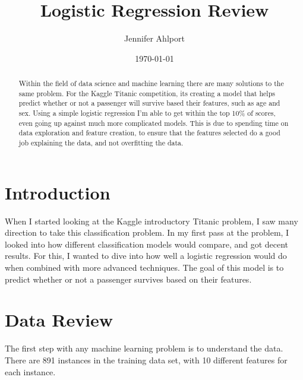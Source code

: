 \documentclass[12pt, letterpaper]{article}
\title{Logistic Regression Review}
\author{Jennifer Ahlport}
\date{\today}
\begin{document}
\maketitle

\begin{abstract}
Within the field of data science and machine learning there are many solutions to the same problem.  For the Kaggle Titanic competition, its creating a model that helps predict whether or not a passenger will survive based their features, such as age and sex. Using a simple logistic regression I'm able to get within the top 10\% of scores, even going up against much more complicated models. This is due to spending time on data exploration and feature creation, to ensure that the features selected do a good job explaining the data, and not overfitting the data.

\end{abstract}

\section{Introduction}
When I started looking at the Kaggle introductory Titanic problem, I saw many direction to take this classification problem. In my first pass at the problem, I looked into how different classification models would compare, and got decent results. For this, I wanted to dive into how well a logistic regression would do when combined with more advanced techniques. The goal of this model is to predict whether or not a passenger survives based on their features.


\section{Data Review}
The first step with any machine learning problem is to understand the data. There are 891 instances in the training data set, with 10 different features for each instance.
\end{document}

